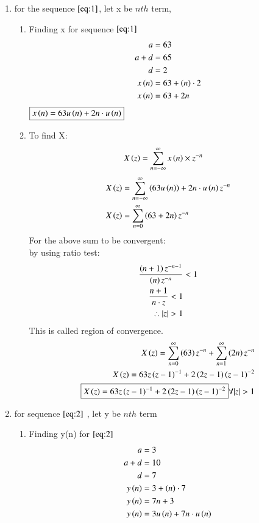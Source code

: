 \documentclass[journal,12pt,twocolumn]{IEEEtran}
\theoremstyle{remark}
\begin{document}
\begin{enumerate}
\item
for the sequence $ \eqref{eq:1}$, let x be $ nth$ term, 
\begin{enumerate}
\item
Finding x for sequence $ \eqref{eq:1}$
\begin{align}
a &= 63\\
a+d &= 65\\
d &= 2\\
x\left(n\right) &= 63 + \left(n\right)\cdot2\\
x\left(n\right) &= 63 + 2n \label{eq:3}
\end{align}
$ \boxed{x\left(n\right) = 63u\left(n\right) + 2n\cdot u\left(n\right)}$\\ 
\item
To find X:
\begin{align}
X\left(z\right) &= \sum_{n=-\infty}^{\infty} x\left(n\right)\times z^{-n}
\end{align}
\begin{align}
X\left(z\right) &= \sum_{n=-\infty}^{\infty} \left(63u\left(n\right)\right) + 2n\cdot u\left(n\right)z^{-n}\\
X\left(z\right) &= \sum_{n=0}^{\infty} \left(63 + 2n\right)z^{-n}
\end{align}
For the above sum to be convergent:\\
by using ratio test:\\
\begin{align}
    \frac{\brak{n+1}z^{-n-1}}{\brak{n}z^{-n}} &<1\\
    \frac{n+1}{n\cdot z}<1\\
    \therefore |z|>1
\end{align}
This is called region of convergence.\\
\begin{align}
X\brak{z} = \sum_{n=0}^{\infty} \brak{63}z^{-n}+\sum_{n=1}^{\infty}\brak{2n}z^{-n}\\
X\brak{z} = 63z\brak{z-1}^{-1} + 2\brak{2z-1}\brak{z-1}^{-2}\\
\boxed{X\brak{z} = 63z\brak{z-1}^{-1} + 2\brak{2z-1}\brak{z-1}^{-2}}  \forall  |z|>1 \label{eq:5}
\end{align}
\end{enumerate}
\item
for sequence $ \eqref{eq:2}$ , let y be $ nth$ term\\
\begin{enumerate}
\item 
Finding y(n) for $ \eqref{eq:2}$
\begin{align}
a &= 3 \\
a+d &= 10\\
d &= 7\\
y\left(n\right) &= 3 + \left(n\right)\cdot 7\\
y\left(n\right) &= 7n + 3 \label{eq:4}\\
y\left(n\right) &= 3u\left(n\right) + 7n\cdot u\left(n\right) \label{eq:4}
\end{align}


\end{enumerate}
\end{enumerate}
\end{document}
